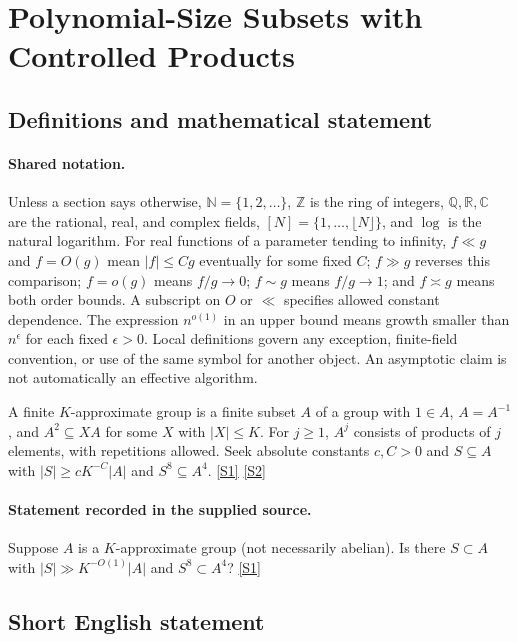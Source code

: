 \documentclass[11pt,a4paper]{article}
\newcommand{\N}{\mathbb{N}}
\newcommand{\Z}{\mathbb{Z}}
\newcommand{\Q}{\mathbb{Q}}
\newcommand{\R}{\mathbb{R}}
\newcommand{\C}{\mathbb{C}}
\newcommand{\sref}[2]{\hyperlink{source:#1:#2}{[S#2]}}
\begin{document}
\section{Polynomial-Size Subsets with Controlled Products}\label{statement}


\subsection{Definitions and mathematical statement}

\paragraph{Shared notation.}Unless a section says otherwise, $\N=\{1,2,\ldots\}$,
$\Z$ is the ring of integers, $\Q,\R,\C$ are the rational, real, and complex
fields, $[N]=\{1,\ldots,\lfloor N\rfloor\}$, and $\log$ is the natural
logarithm. For real functions of a parameter tending to infinity,
$f\ll g$ and $f=O(g)$ mean $|f|\leq Cg$ eventually for some fixed $C$;
$f\gg g$ reverses this comparison; $f=o(g)$ means $f/g\to0$;
$f\sim g$ means $f/g\to1$; and $f\asymp g$ means both order bounds.
A subscript on $O$ or $\ll$ specifies allowed constant dependence.
The expression $n^{o(1)}$ in an upper bound means growth smaller than
$n^\epsilon$ for each fixed $\epsilon>0$. Local definitions govern any
exception, finite-field convention, or use of the same symbol for another
object. An asymptotic claim is not automatically an effective algorithm.



A finite $K$-approximate group is a finite subset $A$ of a group with $1\in A$, $A=A^{-1}$, and $A^2\subseteq XA$ for some $X$ with $|X|\leq K$. For $j\geq1$, $A^j$ consists of products of $j$ elements, with repetitions allowed. Seek absolute constants $c,C>0$ and $S\subseteq A$ with $|S|\geq cK^{-C}|A|$ and $S^8\subseteq A^4$. \sref{statement}{1} \sref{statement}{2}

\paragraph{Statement recorded in the supplied source.}
Suppose $A$ is a $K$-approximate group (not necessarily abelian). Is there $S \subset A$ with $|S| \gg K^{-O(1)}|A|$ and $S^8 \subset A^4$? \sref{statement}{1}

\subsection{Short English statement}
\end{document}
